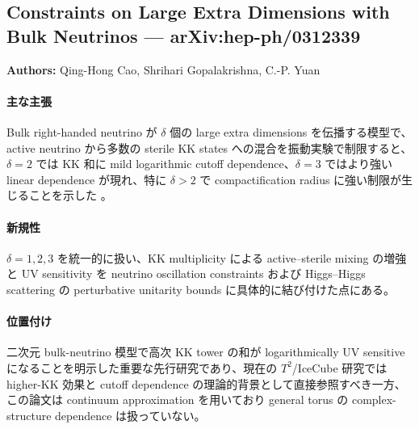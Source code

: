 \subsection{Constraints on Large Extra Dimensions with Bulk Neutrinos --- arXiv:hep-ph/0312339}

\textbf{Authors:} Qing-Hong Cao, Shrihari Gopalakrishna, C.-P. Yuan

\paragraph{主な主張}
Bulk right-handed neutrino が $\delta$ 個の large extra dimensions を伝播する模型で、active neutrino から多数の sterile KK states への混合を振動実験で制限すると、$\delta=2$ では KK 和に mild logarithmic cutoff dependence、$\delta=3$ ではより強い linear dependence が現れ、特に $\delta>2$ で compactification radius に強い制限が生じることを示した \cite{Cao:2003BulkConstraints}。

\paragraph{新規性}
$\delta=1,2,3$ を統一的に扱い、KK multiplicity による active--sterile mixing の増強と UV sensitivity を neutrino oscillation constraints および Higgs--Higgs scattering の perturbative unitarity bounds に具体的に結び付けた点にある。

\paragraph{位置付け}
二次元 bulk-neutrino 模型で高次 KK tower の和が logarithmically UV sensitive になることを明示した重要な先行研究であり、現在の $T^2$/IceCube 研究では higher-KK 効果と cutoff dependence の理論的背景として直接参照すべき一方、この論文は continuum approximation を用いており general torus の complex-structure dependence は扱っていない。
